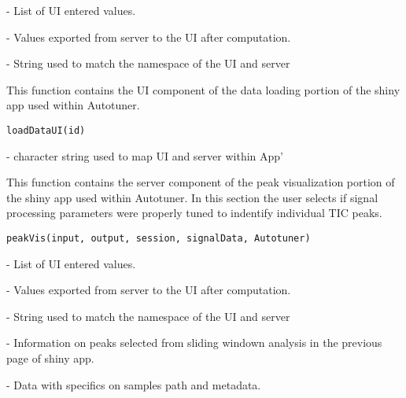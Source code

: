 \documentclass[a4paper]{book}
\begin{document}
%
\begin{Arguments}
\begin{ldescription}
\item[\code{input}] - List of UI entered values.

\item[\code{output}] - Values exported from server to the UI after computation.

\item[\code{session}] - String used to match the namespace of the UI and server
\end{ldescription}
\end{Arguments}
%
\begin{Description}\relax
This function contains the UI component of the data loading
portion of the shiny app used within Autotuner.
\end{Description}
%
\begin{Usage}
\begin{verbatim}
loadDataUI(id)
\end{verbatim}
\end{Usage}
%
\begin{Arguments}
\begin{ldescription}
\item[\code{id}] - character string used to map UI and server within App'
\end{ldescription}
\end{Arguments}
%
\begin{Description}\relax
This function contains the server component of the peak
visualization portion of the shiny app used within Autotuner. In this section
the user selects if signal processing parameters were properly tuned to
indentify individual TIC peaks.
\end{Description}
%
\begin{Usage}
\begin{verbatim}
peakVis(input, output, session, signalData, Autotuner)
\end{verbatim}
\end{Usage}
%
\begin{Arguments}
\begin{ldescription}
\item[\code{input}] - List of UI entered values.

\item[\code{output}] - Values exported from server to the UI after computation.

\item[\code{session}] - String used to match the namespace of the UI and server

\item[\code{signalData}] - Information on peaks selected from sliding windown
analysis in the previous page of shiny app.

\item[\code{Autotuner}] - Data with specifics on samples path and metadata.
\end{ldescription}
\end{Arguments}
\end{document}
